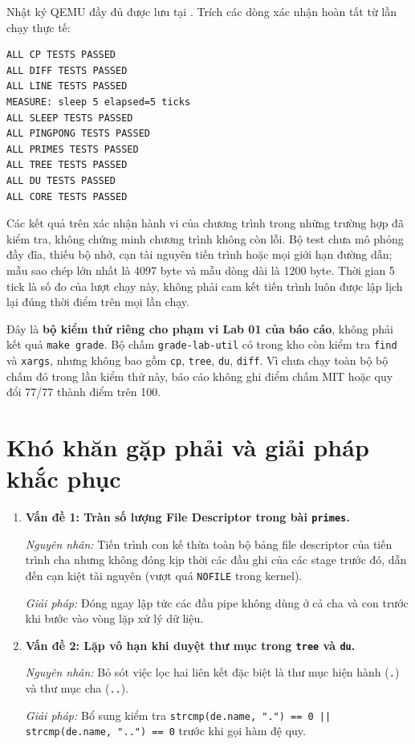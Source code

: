 \documentclass[12pt,a4paper]{article}
\begin{document}
Nhật ký QEMU đầy đủ được lưu tại . Trích các dòng xác nhận hoàn tất từ lần chạy thực tế:

\begin{terminalbox}
\small
\begin{verbatim}
ALL CP TESTS PASSED
ALL DIFF TESTS PASSED
ALL LINE TESTS PASSED
MEASURE: sleep 5 elapsed=5 ticks
ALL SLEEP TESTS PASSED
ALL PINGPONG TESTS PASSED
ALL PRIMES TESTS PASSED
ALL TREE TESTS PASSED
ALL DU TESTS PASSED
ALL CORE TESTS PASSED
\end{verbatim}
\end{terminalbox}

Các kết quả trên xác nhận hành vi của chương trình trong những trường hợp đã kiểm tra, không chứng minh chương trình không còn lỗi. Bộ test chưa mô phỏng đầy đĩa, thiếu bộ nhớ, cạn tài nguyên tiến trình hoặc mọi giới hạn đường dẫn; mẫu sao chép lớn nhất là 4097 byte và mẫu dòng dài là 1200 byte. Thời gian 5 tick là số đo của lượt chạy này, không phải cam kết tiến trình luôn được lập lịch lại đúng thời điểm trên mọi lần chạy.

Đây là \textbf{bộ kiểm thử riêng cho phạm vi Lab 01 của báo cáo}, không phải kết quả \texttt{make grade}. Bộ chấm \texttt{grade-lab-util} có trong kho còn kiểm tra \texttt{find} và \texttt{xargs}, nhưng không bao gồm \texttt{cp}, \texttt{tree}, \texttt{du}, \texttt{diff}. Vì chưa chạy toàn bộ bộ chấm đó trong lần kiểm thử này, báo cáo không ghi điểm chấm MIT hoặc quy đổi 77/77 thành điểm trên 100.
\section{Khó khăn gặp phải và giải pháp khắc phục}

\begin{enumerate}
  \item \textbf{Vấn đề 1: Tràn số lượng File Descriptor trong bài \texttt{primes}.}

  \textit{Nguyên nhân:} Tiến trình con kế thừa toàn bộ bảng file descriptor của tiến trình cha nhưng không đóng kịp thời các đầu ghi của các stage trước đó, dẫn đến cạn kiệt tài nguyên (vượt quá \texttt{NOFILE} trong kernel).

  \textit{Giải pháp:} Đóng ngay lập tức các đầu pipe không dùng ở cả cha và con trước khi bước vào vòng lặp xử lý dữ liệu.

  \item \textbf{Vấn đề 2: Lặp vô hạn khi duyệt thư mục trong \texttt{tree} và \texttt{du}.}

  \textit{Nguyên nhân:} Bỏ sót việc lọc hai liên kết đặc biệt là thư mục hiện hành (\texttt{.}) và thư mục cha (\texttt{..}).

  \textit{Giải pháp:} Bổ sung kiểm tra \texttt{strcmp(de.name, ".") == 0 || strcmp(de.name, "..") == 0} trước khi gọi hàm đệ quy.
\end{enumerate}
\end{document}

